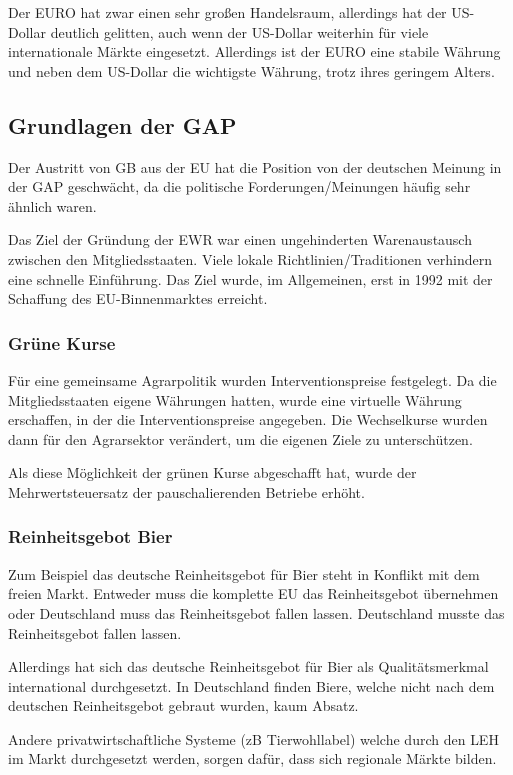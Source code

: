 \documentclass[11pt]{scrartcl}
\begin{document}
Der EURO hat zwar einen sehr großen Handelsraum, allerdings hat der US-Dollar deutlich gelitten, auch wenn der US-Dollar weiterhin für viele internationale Märkte eingesetzt.
Allerdings ist der EURO eine stabile Währung und  neben dem US-Dollar die wichtigste Währung, trotz ihres geringem Alters.

\subsection{Grundlagen der \ac{GAP}}

Der Austritt von \ac{GB} aus der \ac{EU} hat die Position von der deutschen Meinung in der \ac{GAP} geschwächt, da die politische Forderungen/Meinungen häufig sehr ähnlich waren.

Das Ziel der Gründung der \ac{EWR} war einen ungehinderten Warenaustausch zwischen den Mitgliedsstaaten.
Viele lokale Richtlinien/Traditionen verhindern eine schnelle Einführung.
Das Ziel wurde, im Allgemeinen, erst in 1992 mit der Schaffung des \ac{EU}-Binnenmarktes erreicht.

\subsubsection{Grüne Kurse}
Für eine gemeinsame Agrarpolitik wurden Interventionspreise festgelegt.
Da die Mitgliedsstaaten eigene Währungen hatten, wurde eine virtuelle Währung erschaffen, in der die Interventionspreise angegeben.
Die Wechselkurse wurden dann für den Agrarsektor verändert, um die eigenen Ziele zu unterschützen.

Als diese Möglichkeit der grünen Kurse abgeschafft hat, wurde der Mehrwertsteuersatz der pauschalierenden Betriebe erhöht.

\subsubsection{Reinheitsgebot Bier}
Zum Beispiel das deutsche Reinheitsgebot für Bier steht in Konflikt mit dem freien Markt.
Entweder muss die komplette \ac{EU} das Reinheitsgebot übernehmen oder Deutschland muss das Reinheitsgebot fallen lassen.
Deutschland musste das Reinheitsgebot fallen lassen.

Allerdings hat sich das deutsche Reinheitsgebot für Bier als Qualitätsmerkmal international durchgesetzt.
In Deutschland finden Biere, welche nicht nach dem deutschen Reinheitsgebot gebraut wurden, kaum Absatz.

Andere privatwirtschaftliche Systeme (zB Tierwohllabel) welche durch den \ac{LEH} im Markt durchgesetzt werden, sorgen dafür, dass sich regionale Märkte bilden.
\end{document}
